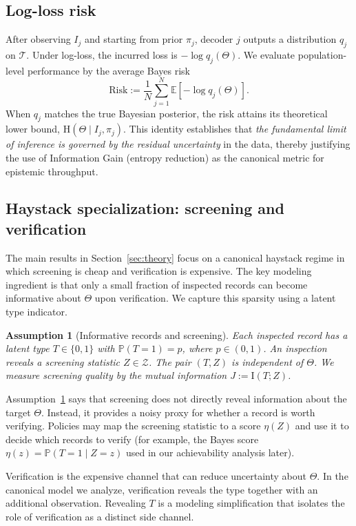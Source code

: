 \documentclass[twocolumn]{scholar7}
\newtheorem{assumption}[theorem]{Assumption}
\newcommand{\cT}{\mathcal{T}}
\newcommand{\cZ}{\mathcal{Z}}
\newcommand{\E}{\mathbb{E}}
\newcommand{\Prob}{\mathbb{P}}
\newcommand{\I}{\mathrm{I}}
\newcommand{\Hh}{\mathrm{H}}
\newcommand{\bracks}[1]{\left[#1\right]}
\begin{document}
\subsection{Log-loss risk}
After observing $I_j$ and starting from prior $\pi_j$, decoder $j$ outputs a distribution $q_j$ on $\cT$.
Under log-loss, the incurred loss is $-\log q_j(\Theta)$.
We evaluate population-level performance by the average Bayes risk
\begin{equation}
  \mathrm{Risk}:=\frac{1}{N}\sum_{j=1}^N \E\bracks{-\log q_j(\Theta)}.
  \label{eq:risk-pop}
\end{equation}
When $q_j$ matches the true Bayesian posterior, the risk attains its theoretical lower bound, $\Hh(\Theta\mid I_j,\pi_j)$. This identity establishes that \emph{the fundamental limit of inference is governed by the residual uncertainty} in the data, thereby justifying the use of Information Gain (entropy reduction) as the canonical metric for epistemic throughput.

\subsection{Haystack specialization: screening and verification}
The main results in Section~\ref{sec:theory} focus on a canonical haystack regime in which screening is cheap and verification is expensive.
The key modeling ingredient is that only a small fraction of inspected records can become informative about $\Theta$ upon verification.
We capture this sparsity using a latent type indicator.

\begin{assumption}[Informative records and screening]
\label{asmp:screening}
Each inspected record has a latent type $T\in\{0,1\}$ with $\Prob(T=1)=p$, where $p\in(0,1)$.
An inspection reveals a screening statistic $Z\in\cZ$.
The pair $(T,Z)$ is independent of $\Theta$.
We measure screening quality by the mutual information $J:=\I(T;Z)$.
\end{assumption}

Assumption~\ref{asmp:screening} says that screening does not directly reveal information about the target $\Theta$.
Instead, it provides a noisy proxy for whether a record is worth verifying.
Policies may map the screening statistic to a score $\eta(Z)$ and use it to decide which records to verify (for example, the Bayes score $\eta(z)=\Prob(T=1\mid Z=z)$ used in our achievability analysis later).

Verification is the expensive channel that can reduce uncertainty about $\Theta$.
In the canonical model we analyze, verification reveals the type together with an additional observation.
Revealing $T$ is a modeling simplification that isolates the role of verification as a distinct side channel.
\end{document}
